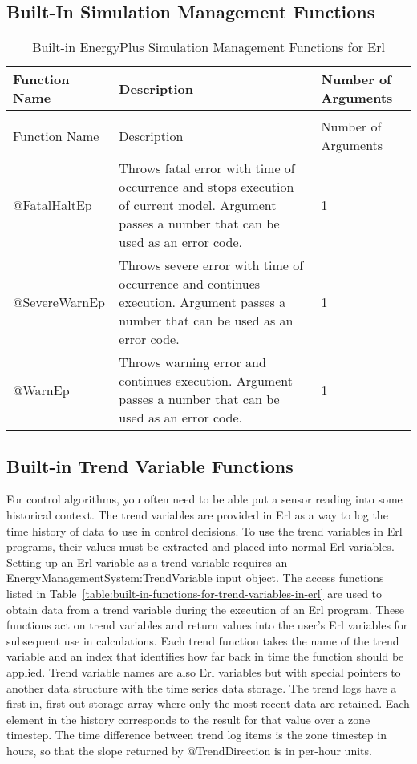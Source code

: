 \subsection{Built-In Simulation Management Functions}\label{built-in-simulation-management-functions}

\begin{longtable}[c]{p{1.5in}p{3.0in}p{1.5in}}
\caption{Built-in EnergyPlus Simulation Management Functions for Erl \label{table:built-in-energyplus-simulation-management}} \tabularnewline
\toprule 
Function Name & Description & Number of Arguments \tabularnewline \midrule
\endfirsthead

\caption[]{Built-in EnergyPlus Simulation Management Functions for Erl} \tabularnewline
\toprule 
Function Name & Description & Number of Arguments \tabularnewline \midrule
\endhead

@FatalHaltEp & Throws fatal error with time of occurrence and stops execution of current model. Argument passes a number that can be used as an error code. & 1 \tabularnewline
@SevereWarnEp & Throws severe error with time of occurrence and continues execution. Argument passes a number that can be used as an error code. & 1 \tabularnewline
@WarnEp & Throws warning error and continues execution. Argument passes a number that can be used as an error code. & 1 \tabularnewline
\bottomrule
\end{longtable}

\subsection{Built-in Trend Variable Functions}\label{built-in-trend-variable-functions}

For control algorithms, you often need to be able put a sensor reading into some historical context. The trend variables are provided in Erl as a way to log the time history of data to use in control decisions. To use the trend variables in Erl programs, their values must be extracted and placed into normal Erl variables. Setting up an Erl variable as a trend variable requires an EnergyManagementSystem:TrendVariable input object. The access functions listed in Table~\ref{table:built-in-functions-for-trend-variables-in-erl} are used to obtain data from a trend variable during the execution of an Erl program. These functions act on trend variables and return values into the user's Erl variables for subsequent use in calculations. Each trend function takes the name of the trend variable and an index that identifies how far back in time the function should be applied. Trend variable names are also Erl variables but with special pointers to another data structure with the time series data storage. The trend logs have a first-in, first-out storage array where only the most recent data are retained. Each element in the history corresponds to the result for that value over a zone timestep. The time difference between trend log items is the zone timestep in hours, so that the slope returned by @TrendDirection is in per-hour units.

